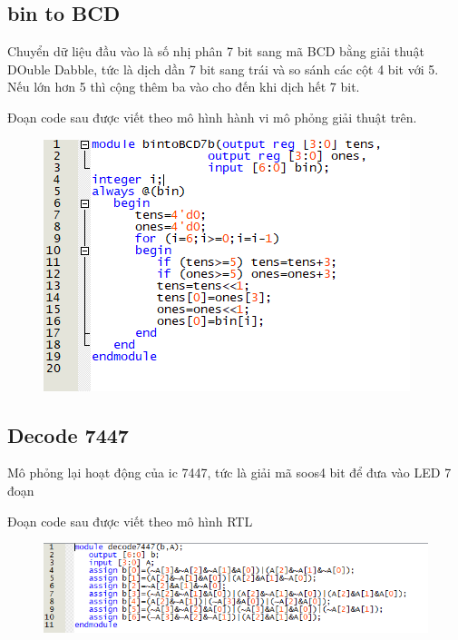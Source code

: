\documentclass[a4paper]{article}
\begin{document}
	\subsection{bin to BCD}
	Chuyển dữ liệu đầu vào là số nhị phân 7 bit sang mã BCD bằng giải thuật DOuble Dabble, tức là dịch dần 7 bit sang trái và so sánh các cột 4 bit với 5. Nếu lớn hơn 5 thì cộng thêm ba vào cho đến khi dịch hết 7 bit.  
	
	Đoạn code sau được viết theo mô hình hành vi mô phỏng giải thuật trên.\cite{bib3}
	
	\begin{center}
	\begin{figure}[H]
		\begin{center}
			\includegraphics[scale=.83] {b.png}
		\end{center}
	\end{figure}
	\end{center}
	
	\subsection{Decode 7447}
	Mô phỏng lại hoạt động của ic 7447, tức là giải mã soos4 bit để đưa vào LED 7 đoạn
	
	Đoạn code sau được viết theo mô hình RTL
	
	\begin{center}
	\begin{figure}[H]
		\begin{center}
			\includegraphics[scale=.83] {de.png}
		\end{center}
	\end{figure}
	\end{center}  
\end{document}
